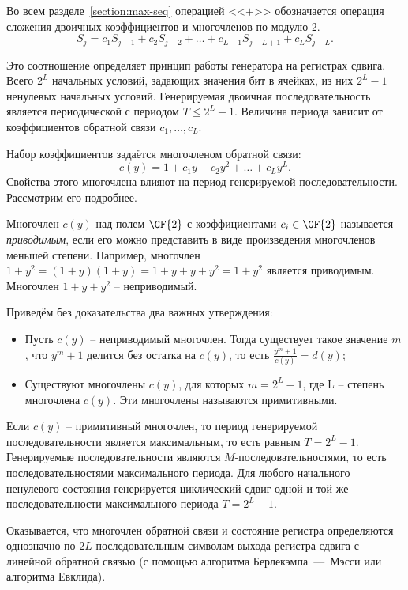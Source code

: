 Во всем разделе~\ref{section:max-seq}  операцией <<$+$>>  обозначается операция сложения двоичных коэффициентов и многочленов по модулю 2.
\[
    S_{j} = c_{1} S_{j-1} + c_{2} S_{j-2} +  \dots  + c_{L-1} S_{j-L+1} + c_{L} S_{j-L}.
\]

Это соотношение определяет принцип работы генератора на регистрах сдвига. Всего $2^{L}$ начальных условий, задающих значения бит в ячейках, из них $2^{L}-1$ ненулевых начальных условий. Генерируемая двоичная последовательность является периодической с периодом $T\leq 2^{L}-1$. Величина периода зависит от коэффициентов обратной связи $c_{1},  \ldots, c_{L} $.

Набор коэффициентов задаётся многочленом обратной связи:
    \[ c(y) = 1 + c_1 y+ c_2 y^2 + \dots + c_L y^L. \]
Свойства этого многочлена влияют на период генерируемой последовательности. Рассмотрим его подробнее.

Многочлен $c(y)$ над полем $\GF{2}$ с коэффициентами $c_i \in \GF{2}$ называется \textit{приводимым}, если его можно представить в виде произведения многочленов меньшей степени. Например, многочлен $1 + y^{2} = (1 + y) (1 + y) = 1 + y + y + y^2 = 1 + y^2$ является приводимым. Многочлен $1 + y + y^{2}$ -- неприводимый.

Приведём без доказательства два важных утверждения:
\begin{itemize}
    \item Пусть $c(y)$ -- неприводимый многочлен. Тогда существует такое значение $m$, что $y^{m} + 1$ делится без остатка на $c(y)$, то есть $\frac{y^{m} + 1}{c(y)} = d(y)$;
    \item Существуют многочлены $c(y)$, для которых $m=2^{L} - 1$, где L -- степень многочлена $c(y)$. Эти многочлены называются примитивными.
\end{itemize}

Если $c(y)$ -- примитивный многочлен, то период генерируемой последовательности является максимальным, то есть равным $T = 2^{L} - 1$. Генерируемые последовательности являются $M$-последовательностями, то есть последовательностями максимального периода. Для любого начального ненулевого состояния генерируется циклический сдвиг одной и той же последовательности максимального периода $T=2^{L} - 1$.

Оказывается, что многочлен обратной связи и состояние регистра определяются однозначно по $2L$ последовательным символам выхода регистра сдвига с линейной обратной связью (с помощью алгоритма Берлекэмпа~---~Мэсси или алгоритма Евклида).

